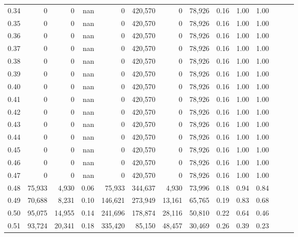 \begin{tabular}{rrrrrrrrrrrrrr}
0.34 &       0 &       0 &   nan &        0 &  420,570 &       0 &  78,926 &  0.16 &  1.00 &      1.00 \\
0.35 &       0 &       0 &   nan &        0 &  420,570 &       0 &  78,926 &  0.16 &  1.00 &      1.00 \\
0.36 &       0 &       0 &   nan &        0 &  420,570 &       0 &  78,926 &  0.16 &  1.00 &      1.00 \\
0.37 &       0 &       0 &   nan &        0 &  420,570 &       0 &  78,926 &  0.16 &  1.00 &      1.00 \\
0.38 &       0 &       0 &   nan &        0 &  420,570 &       0 &  78,926 &  0.16 &  1.00 &      1.00 \\
0.39 &       0 &       0 &   nan &        0 &  420,570 &       0 &  78,926 &  0.16 &  1.00 &      1.00 \\
0.40 &       0 &       0 &   nan &        0 &  420,570 &       0 &  78,926 &  0.16 &  1.00 &      1.00 \\
0.41 &       0 &       0 &   nan &        0 &  420,570 &       0 &  78,926 &  0.16 &  1.00 &      1.00 \\
0.42 &       0 &       0 &   nan &        0 &  420,570 &       0 &  78,926 &  0.16 &  1.00 &      1.00 \\
0.43 &       0 &       0 &   nan &        0 &  420,570 &       0 &  78,926 &  0.16 &  1.00 &      1.00 \\
0.44 &       0 &       0 &   nan &        0 &  420,570 &       0 &  78,926 &  0.16 &  1.00 &      1.00 \\
0.45 &       0 &       0 &   nan &        0 &  420,570 &       0 &  78,926 &  0.16 &  1.00 &      1.00 \\
0.46 &       0 &       0 &   nan &        0 &  420,570 &       0 &  78,926 &  0.16 &  1.00 &      1.00 \\
0.47 &       0 &       0 &   nan &        0 &  420,570 &       0 &  78,926 &  0.16 &  1.00 &      1.00 \\
0.48 &  75,933 &   4,930 &  0.06 &   75,933 &  344,637 &   4,930 &  73,996 &  0.18 &  0.94 &      0.84 \\
0.49 &  70,688 &   8,231 &  0.10 &  146,621 &  273,949 &  13,161 &  65,765 &  0.19 &  0.83 &      0.68 \\
0.50 &  95,075 &  14,955 &  0.14 &  241,696 &  178,874 &  28,116 &  50,810 &  0.22 &  0.64 &      0.46 \\
0.51 &  93,724 &  20,341 &  0.18 &  335,420 &   85,150 &  48,457 &  30,469 &  0.26 &  0.39 &      0.23 \\

\end{tabular}
